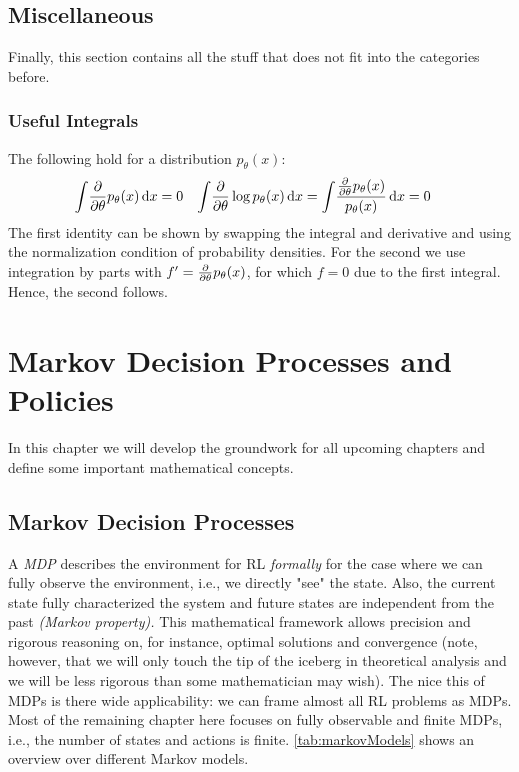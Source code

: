 	\section{Miscellaneous}
		Finally, this section contains all the stuff that does not fit into the categories before.

		\subsection{Useful Integrals}
			The following hold for a distribution \( p_\theta(x) \):
			\begin{align}
				\int\! \pdv{\theta} p_\theta(x) \dd{x}      & = 0                                                              &
				\int\! \pdv{\theta} \log p_\theta(x) \dd{x} & = \int\! \frac{\pdv{\theta} p_\theta(x)}{p_\theta(x)} \dd{x} = 0
				\label{eq:usefulIntegrals}
			\end{align}
			The first identity can be shown by swapping the integral and derivative and using the normalization condition of probability densities. For the second we use integration by parts with \( f' = \pdv{\theta} p_\theta(x) \), for which \(f = 0\) due to the first integral. Hence, the second follows.

\chapter{Markov Decision Processes and Policies}
	In this chapter we will develop the groundwork for all upcoming chapters and define some important mathematical concepts.

	\section{Markov Decision Processes}
		A \emph{\ac{MDP}} describes the environment for \ac{RL} \emph{formally} for the case where we can fully observe the environment, i.e., we directly "see" the state. Also, the current state fully characterized the system and future states are independent from the past \emph{(Markov property).} This mathematical framework allows precision and rigorous reasoning on, for instance, optimal solutions and convergence (note, however, that we will only touch the tip of the iceberg in theoretical analysis and we will be less rigorous than some mathematician may wish). The nice this of \acp{MDP} is there wide applicability: we can frame almost all \ac{RL} problems as \acp{MDP}. Most of the remaining chapter here focuses on fully observable and finite \acp{MDP}, i.e., the number of states and actions is finite. \autoref{tab:markovModels} shows an overview over different Markov models.

